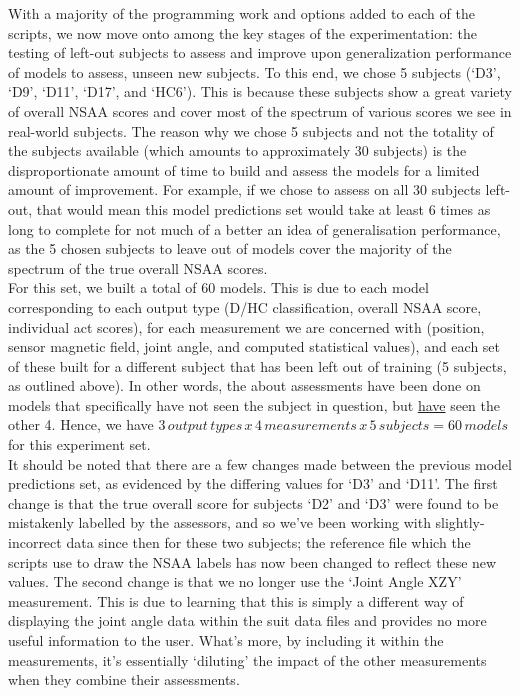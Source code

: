 \documentclass[12pt,twoside]{report}
\begin{document}
\quad With a majority of the programming work and options added to each of the scripts, we now move onto among the key stages of the experimentation: the testing of left-out subjects to assess and improve upon generalization performance of models to assess, unseen new subjects. To this end, we chose 5 subjects (‘D3’, ‘D9’, ‘D11’, ‘D17’, and ‘HC6’). This is because these subjects show a great variety of overall NSAA scores and cover most of the spectrum of various scores we see in real-world subjects. The reason why we chose 5 subjects and not the totality of the subjects available (which amounts to approximately 30 subjects) is the disproportionate amount of time to build and assess the models for a limited amount of improvement. For example, if we chose to assess on all 30 subjects left-out, that would mean this model predictions set would take at least 6 times as long to complete for not much of a better an idea of generalisation performance, as the 5 chosen subjects to leave out of models cover the majority of the spectrum of the true overall NSAA scores.\\

\quad For this set, we built a total of 60 models. This is due to each model corresponding to each output type (D/HC classification, overall NSAA score, individual act scores), for each measurement we are concerned with (position, sensor magnetic field, joint angle, and computed statistical values), and each set of these built for a different subject that has been left out of training (5 subjects, as outlined above). In other words, the about assessments have been done on models that specifically have not seen the subject in question, but \underline{have} seen the other 4. Hence, we have $3\, output\, types\, x\, 4\, measurements\, x\, 5\, subjects=60\, models$ for this experiment set.\\

\quad It should be noted that there are a few changes made between the previous model predictions set, as evidenced by the differing values for ‘D3’ and ‘D11’. The first change is that the true overall score for subjects ‘D2’ and ‘D3’ were found to be mistakenly labelled by the assessors, and so we’ve been working with slightly-incorrect data since then for these two subjects; the reference file which the scripts use to draw the NSAA labels has now been changed to reflect these new values. The second change is that we no longer use the ‘Joint Angle XZY’ measurement. This is due to learning that this is simply a different way of displaying the joint angle data within the suit data files and provides no more useful information to the user. What’s more, by including it within the measurements, it’s essentially ‘diluting’ the impact of the other measurements when they combine their assessments.
\end{document}
